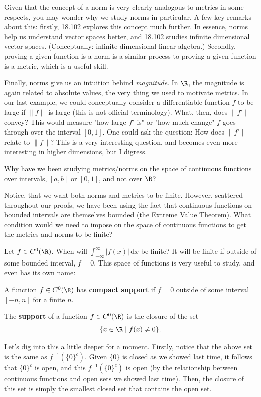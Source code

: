 Given that the concept of a norm is very clearly analogous to metrics in some respects, you may wonder why we study norms in particular. A few key remarks about this: firstly, 18.102 explores this concept much further. In essence, norms help us understand vector spaces better, and 18.102 studies infinite dimensional vector spaces. (Conceptually: infinite dimensional linear algebra.) Secondly, proving a given function is a norm is a similar process to proving a given function is a metric, which is a useful skill. 

Finally, norms give us an intuition behind \textit{magnitude}. In $\R$, the magnitude is again related to absolute values, the very thing we used to motivate metrics. In our last example, we could conceptually consider a differentiable function $f$ to be large if $\lVert f\rVert$ is large (this is not official terminology). What, then, does $\lVert f'\rVert$ convey? This would measure "how large $f'$ is" or "how much change" $f$ goes through over the interval $[0,1]$. One could ask the question: How does $\lVert f'\rVert$ relate to $\lVert f\rVert$? This is a very interesting question, and becomes even more interesting in higher dimensions, but I digress.

\begin{question}
Why have we been studying metrics/norms on the space of continuous functions over intervals, $[a,b]$ or $[0,1]$, and not over $\R$?
\end{question}
Notice, that we want both norms and metrics to be finite. However, scattered throughout our proofs, we have been using the fact that continuous functions on bounded intervals are themselves bounded (the Extreme Value Theorem). What condition would we need to impose on the space of continuous functions to get the metrics and norms to be finite? 

Let $f\in C^0(\R)$. When will $\int_{-\infty}^\infty |f(x)|\,\mathrm dx$
be finite? It will be finite if outside of some bounded interval, $f = 0$. This space of functions is very useful to study, and even has its own name:
\begin{definition}
A function $f\in C^0(\R)$ has \textbf{compact support} if $f = 0$ outside of some interval $[-n,n]$ for a finite $n.$
\end{definition}

\begin{definition}[Support]
The \textbf{support} of a function $f\in C^0(\R)$ is the closure of the set 
\[
\{x\in \R \mid f(x) \neq 0\}.
\]
\end{definition}
Let's dig into this a little deeper for a moment. Firstly, notice that the above set is the same as $f^{-1}(\{0\}^c)$. Given $\{0\}$ is closed as we showed last time, it follows that $\{0\}^c$ is open, and this $f^{-1}(\{0\}^c)$ is open (by the relationship between continuous functions and open sets we showed last time). Then, the closure of this set is simply the smallest closed set that contains the open set.

